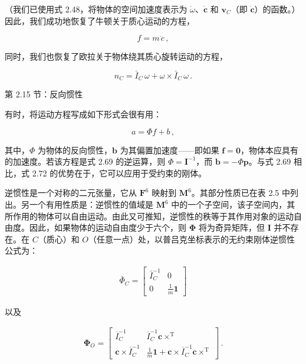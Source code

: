 \documentclass[10pt,a4paper]{book}
\theoremstyle{thmstyle} %
\theoremstyle{defstyle} %
\theoremstyle{prostyle} %
\begin{document}
（我们已使用式 2.48，将物体的空间加速度表示为 $\dot{\omega}$、$\dot{\mathbf{c}}$ 和 $\mathbf{v}_{C}$（即 $\dot{\mathbf{c}}$）的函数。）因此，我们成功地恢复了牛顿关于质心运动的方程，



$$
f = m \, \ddot { c } \, ,
$$



同时，我们也恢复了欧拉关于物体绕其质心旋转运动的方程，



$$
n _ { C } = \bar { I } _ { C } \, \omega + \omega \times \bar { I } _ { C } \, \omega \, .
$$



第 2.15 节：反向惯性



有时，将运动方程写成如下形式会很有用：



$$
a = \Phi f + b \, ,
$$



其中，$\Phi$ 为物体的反向惯性，$\boldsymbol{b}$ 为其偏置加速度——即如果 $\boldsymbol{f}=\boldsymbol{0}$，物体本应具有的加速度。若该方程是式 2.69 的逆运算，则 $\Phi=\boldsymbol{I}^{-1}$，而 $\boldsymbol{b}=-\Phi\boldsymbol{p}$。与式 2.69 相比，式 2.72 的优势在于，它可以应用于受约束的刚体。



逆惯性是一个对称的二元张量，它从 $\mathbf{F}^{6}$ 映射到 $\mathbf{M}^{6}$。其部分性质已在表 2.5 中列出。另一个有用性质是：逆惯性的值域是 $\mathbf{M}^{6}$ 中的一个子空间，该子空间内，其所作用的物体可以自由运动。由此又可推知，逆惯性的秩等于其作用对象的运动自由度。因此，如果物体的运动自由度少于六个，则 $\boldsymbol{\Phi}$ 将为奇异矩阵，但 $\boldsymbol{I}$ 并不存在。在 $C$（质心）和 $O$（任意一点）处，以普吕克坐标表示的无约束刚体逆惯性公式为：



$$
\begin{array}{r} { \bar { \Phi } _ { C } = \left[ \begin{array}{ll} { \bar { I } _ { C } ^{- 1} } & { 0 } \\{ 0 } & { \frac { 1 } { m } \mathbf { 1 } } \end{array} \right] } \end{array}
$$



以及



$$
\begin{array}{r} { \boldsymbol { \Phi } _ { O } = \left[ \begin{array}{ll} { \overline { { I } } _ { C } ^{- 1} } & { \overline { { I } } _ { C } ^{- 1} \boldsymbol { c } \times ^{\mathrm { T} } } \\{ \boldsymbol { c } \times \overline { { I } } _ { C } ^{- 1} } & { \frac { 1 } { m } \boldsymbol { 1 } + \boldsymbol { c } \times \overline { { I } } _ { C } ^{- 1} \boldsymbol { c } \times ^{\mathrm { T} } } \end{array} \right] \, . } \end{array}
$$
\end{document}

